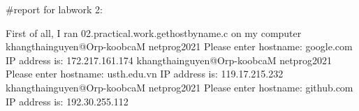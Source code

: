 #report for labwork 2:

First of all, I ran 02.practical.work.gethostbyname.c on my computer
khangthainguyen@Orp-koobcaM netprog2021 %
 Please enter hostname: 
google.com
IP address is: 
172.217.161.174
khangthainguyen@Orp-koobcaM netprog2021 %
 Please enter hostname: 
usth.edu.vn
IP address is: 
119.17.215.232
khangthainguyen@Orp-koobcaM netprog2021 %
 Please enter hostname: 
github.com
IP address is: 
192.30.255.112

